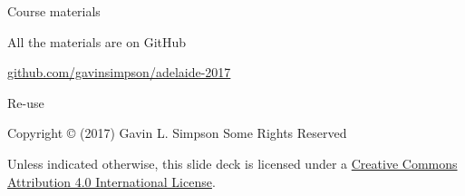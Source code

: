 \documentclass[10pt,ignorenonframetext,compress, aspectratio=169]{beamer}
\begin{document}
\begin{frame}{Course materials}

All the materials are on GitHub

\href{http://github.com/gavinsimpson/adelaide-2017}{github.com/gavinsimpson/adelaide-2017}

\end{frame}

\begin{frame}{Re-use}

Copyright © (2017) Gavin L. Simpson Some Rights Reserved

Unless indicated otherwise, this slide deck is licensed under a
\href{http://creativecommons.org/licenses/by/4.0/}{Creative Commons
Attribution 4.0 International License}.

\begin{center}
  \ccby
\end{center}

\end{frame}
\end{document}
